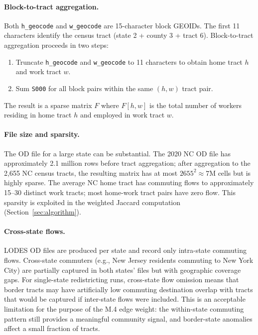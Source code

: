 \paragraph{Block-to-tract aggregation.}
Both \texttt{h\_geocode} and \texttt{w\_geocode} are 15-character block GEOIDs.
The first 11 characters identify the census tract (state 2 + county 3 +
tract 6).
Block-to-tract aggregation proceeds in two steps:
\begin{enumerate}
  \item Truncate \texttt{h\_geocode} and \texttt{w\_geocode} to 11 characters
    to obtain home tract $h$ and work tract $w$.
  \item Sum \texttt{S000} for all block pairs within the same $(h, w)$ tract pair.
\end{enumerate}
The result is a sparse matrix $F$ where $F[h, w]$ is the total number of
workers residing in home tract $h$ and employed in work tract $w$.

\paragraph{File size and sparsity.}
The OD file for a large state can be substantial.
The 2020 NC OD file has approximately 2.1 million rows before tract
aggregation; after aggregation to the 2,655 NC census tracts, the resulting
matrix has at most $2655^2 \approx 7$M cells but is highly sparse.
The average NC home tract has commuting flows to approximately 15--30
distinct work tracts; most home-work tract pairs have zero flow.
This sparsity is exploited in the weighted Jaccard computation
(Section~\ref{sec:algorithm}).

\paragraph{Cross-state flows.}
LODES OD files are produced per state and record only intra-state commuting
flows.
Cross-state commuters (e.g., New Jersey residents commuting to New York City)
are partially captured in both states' files but with geographic coverage gaps.
For single-state redistricting runs, cross-state flow omission means that
border tracts may have artificially low commuting destination overlap with
tracts that would be captured if inter-state flows were included.
This is an acceptable limitation for the purpose of the M.4 edge weight:
the within-state commuting pattern still provides a meaningful community signal,
and border-state anomalies affect a small fraction of tracts.

